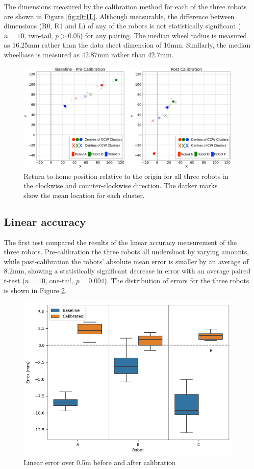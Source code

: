 \documentclass[conference]{IEEEtran}
\begin{document}
The dimensions measured by the calibration method for each of the three robots are shown in Figure \ref{fig:r0r1L}. 
Although measurable, the difference between dimensions (R0, R1 and L) of any of the robots is not statistically significant ($n = 10$, two-tail, $p > 0.05 $) for any pairing. 
The median wheel radius is measured as 16.25mm rather than the data sheet dimension of 16mm. 
Similarly, the median wheelbase is measured as 42.87mm rather than 42.7mm.

\begin{figure}[h!]
    \centering
    \includegraphics[width=.95\textwidth]{img/xy_pre_post_2.png}
    \caption{Return to home position relative to the origin for all three robots in the clockwise and counter-clockwise direction. The darker marks show the mean location for each cluster.}
    \label{fig:xy_scatter}
\end{figure}

\subsection{Linear accuracy}


The first test compared the results of the linear accuracy measurement of the three robots. 
Pre-calibration the three robots all undershoot by varying amounts, while post-calibration the robots' absolute mean error is smaller by an average of 8.2mm, showing a statistically significant decrease in error with an average paired t-test ($n = 10$, one-tail, $p = 0.004$). The distribution of errors for the three robots is shown in Figure \ref{fig:linear}.

\begin{figure}[h]
    \centering
    \includegraphics[width=.49\textwidth]{img/linear_pre_post.png}
    \caption{Linear error over 0.5m before and after calibration}
    \label{fig:linear}
\end{figure}
\end{document}
